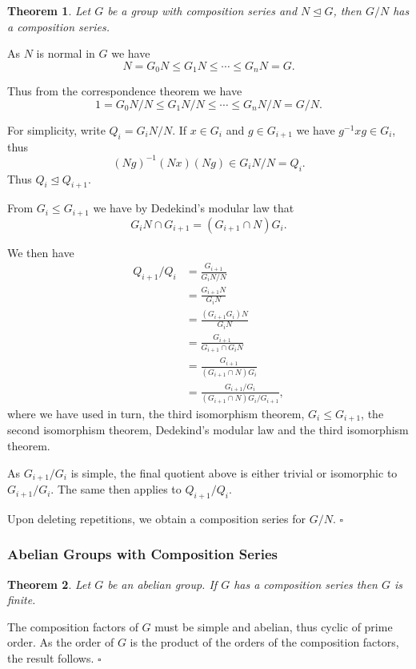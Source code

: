 \documentclass[10pt]{article}
\newtheorem{theorem}{Theorem}[section]
\newenvironment{proof}[1][Proof]{\begin{trivlist}
\item[\hskip \labelsep {\itshape #1}]}{\end{trivlist}}
\begin{document}
\begin{theorem}
Let $G$ be a group with composition series and $N \mathrel{\unlhd} G$, then $G/N$ has a composition series.
\end{theorem}

\begin{proof}
As $N$ is normal in $G$ we have
$$N = G_0N \leq G_1N \leq \cdots \leq G_nN = G.$$

Thus from the correspondence theorem we have
$$1 = G_0N/N \leq G_1N/N \leq \cdots \leq G_nN/N = G/N.$$

For simplicity, write $Q_i = G_iN/N$. If $x \in G_i$ and $g \in G_{i+1}$ we have $g^{-1}xg \in G_i$, thus
$$(Ng)^{-1}(Nx)(Ng) \in G_iN/N = Q_i.$$
Thus $Q_i \mathrel{\unlhd} Q_{i+1}$.

From $G_i \leq G_{i+1}$ we have by Dedekind's modular law that
$$G_iN\cap G_{i+1} = (G_{i+1}\cap N)G_i.$$

We then have
\begin{align*}
Q_{i+1}/Q_i &= \frac{G_{i+1}}{G_iN/N}\\
&= \frac{G_{i+1}N}{G_iN}\\
&= \frac{(G_{i+1}G_i)N}{G_iN}\\
&= \frac{G_{i+1}}{G_{i+1}\cap G_iN}\\
&= \frac{G_{i+1}}{(G_{i+1}\cap N)G_i}\\
&= \frac{G_{i+1}/G_i}{(G_{i+1}\cap N)G_i/G_{i+1}},
\end{align*}
where we have used in turn, the third isomorphism theorem, $G_i \leq G_{i+1}$, the second isomorphism theorem, Dedekind's modular law and the third isomorphism theorem.

As $G_{i+1}/G_i$ is simple, the final quotient above is either trivial or isomorphic to $G_{i+1}/G_i$. The same then applies to $Q_{i+1}/Q_i$.

Upon deleting repetitions, we obtain a composition series for $G/N$. $\square$
\end{proof}

\subsubsection{Abelian Groups with Composition Series}

\begin{theorem}
Let $G$ be an abelian group. If $G$ has a composition series then $G$ is finite.
\end{theorem}

\begin{proof}
The composition factors of $G$ must be simple and abelian, thus cyclic of prime order. As the order of $G$ is the product of the orders of the composition factors, the result follows. $\square$
\end{proof}
\end{document}

